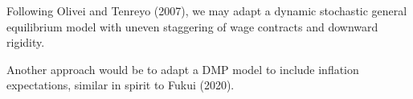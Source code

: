 \documentclass[12pt]{article}
\begin{document}
	Following Olivei and Tenreyo (2007), we may adapt a dynamic stochastic general equilibrium model with uneven staggering of wage contracts and downward rigidity. \cite{oliveiTimingMonetaryPolicy2007}

	Another approach would be to adapt a DMP model to include inflation expectations, similar in spirit to Fukui (2020).  \cite{fukuiTheoryWageRigidity}



	\newpage
	
	
	
\end{document}
